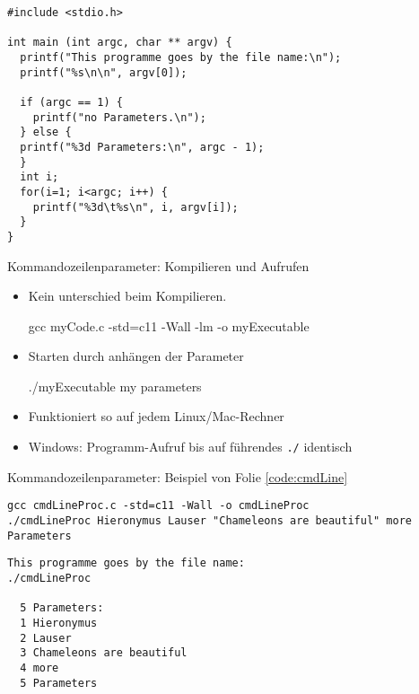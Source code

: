 \begin{frame}[fragile]
%
\begin{codebox}\label{code:cmdLine}
\begin{verbatim}
#include <stdio.h>

int main (int argc, char ** argv) {
  printf("This programme goes by the file name:\n");
  printf("%s\n\n", argv[0]);
  
  if (argc == 1) {
    printf("no Parameters.\n");
  } else {
  printf("%3d Parameters:\n", argc - 1);
  }
  int i;
  for(i=1; i<argc; i++) {
    printf("%3d\t%s\n", i, argv[i]);
  }
}
\end{verbatim}
\end{codebox}
%
\end{frame}


\begin{frame}[fragile]{Kommandozeilenparameter: Kompilieren und Aufrufen}
%
\begin{itemize}
\item Kein unterschied beim Kompilieren.
	\begin{cmdbox}
	\footnotesize 
	gcc myCode.c -std=c11 -Wall -lm -o myExecutable
	\end{cmdbox}
\item Starten durch anhängen der Parameter
	\begin{cmdbox}
	\footnotesize 
	./myExecutable my parameters
	\end{cmdbox}
\item Funktioniert so auf jedem Linux/Mac-Rechner
\item Windows: Programm-Aufruf bis auf führendes \texttt{./} identisch
\end{itemize}
%
\end{frame}


\begin{frame}[fragile]{Kommandozeilenparameter: Beispiel von Folie \ref{code:cmdLine}}
%
\begin{cmdbox}
\begin{verbatim}
gcc cmdLineProc.c -std=c11 -Wall -o cmdLineProc
./cmdLineProc Hieronymus Lauser "Chameleons are beautiful" more Parameters
\end{verbatim}
\end{cmdbox}
%
\begin{cmdbox}[Ausgabe]
\begin{verbatim}
This programme goes by the file name:
./cmdLineProc

  5 Parameters:
  1	Hieronymus 
  2	Lauser 
  3	Chameleons are beautiful
  4	more 
  5	Parameters
\end{verbatim}
\end{cmdbox}
%
\end{frame}